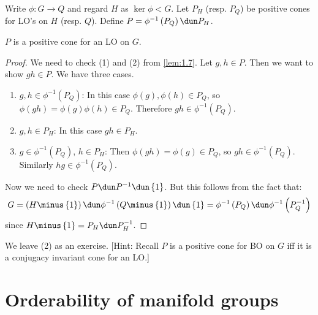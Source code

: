 \begin{Proof}
Write $\phi : G\to Q$ and regard $H$ as $\ker \phi < G$.
Let $P_H$ (resp. $P_Q$) be positive cones for LO's on $H$ (resp. $Q$).
Define $P = \phi^{-1}\left(P_Q\right)\dun P_H$.
\begin{clm}
$P$ is a positive cone for an LO on $G$.
\end{clm}
\begin{proof}
We need to check (1) and (2) from \cref{lem:1.7}.
Let $g,h\in P$. Then we want to show $gh\in P$.
We have three cases.
\begin{enumerate}[label = (\abc)]
\item $g,h\in \phi^{-1}\left(P_Q\right)$: In this case
$\phi\left(g\right),\phi\left(h\right)\in P_Q$, so $\phi\left(gh\right) =
\phi\left(g\right)\phi\left(h\right)\in P_Q$. Therefore $gh\in \phi^{-1}\left(P_Q\right)$.

\item $g,h\in P_H$: In this case $gh\in P_H$.

\item $g\in \phi^{-1}\left(P_Q\right)$, $h\in P_H$:
Then $\phi\left(gh\right) = \phi\left(g\right)\in P_Q$, so $gh\in
\phi^{-1}\left(P_Q\right)$. Similarly $hg\in \phi^{-1}\left(P_Q\right)$.
\end{enumerate}

Now we need to check $P\dun P^{-1}\dun \left\{1\right\}$.
But this follows from the fact that:
\begin{equation}
G = \left(H\minus \left\{1\right\}\right) \dun \phi^{-1}\left(Q\minus
\left\{1\right\}\right)\dun \left\{1\right\}
= \phi^{-1}\left(P_Q\right)\dun \phi^{-1}\left(P_Q^{-1}\right)
\end{equation}
since $H\minus \left\{1\right\} = P_H\dun P_H^{-1}$.
\end{proof}

We leave (2) as an exercise.
[Hint: Recall $P$ is a positive cone for
BO on $G$ iff it is a conjugacy invariant cone for an LO.]
\end{Proof}

\section{Orderability of manifold groups}

